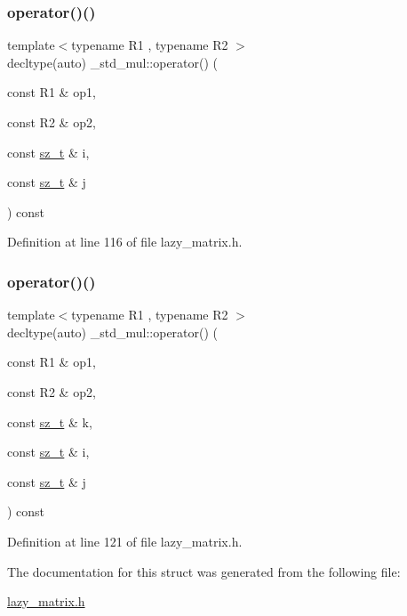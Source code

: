 \subsubsection{\texorpdfstring{operator()()}{operator()()}\hspace{0.1cm}{\footnotesize\ttfamily [1/2]}}
{\footnotesize\ttfamily template$<$typename R1 , typename R2 $>$ \\
decltype(auto) \+\_\+std\+\_\+mul\+::operator() (\begin{DoxyParamCaption}\item[{const R1 \&}]{op1,  }\item[{const R2 \&}]{op2,  }\item[{const \mbox{\hyperlink{lazy__matrix_8h_acba2745dcfc55b2d05ff45adc6a0a015}{sz\+\_\+t}} \&}]{i,  }\item[{const \mbox{\hyperlink{lazy__matrix_8h_acba2745dcfc55b2d05ff45adc6a0a015}{sz\+\_\+t}} \&}]{j }\end{DoxyParamCaption}) const\hspace{0.3cm}{\ttfamily [inline]}}



Definition at line 116 of file lazy\+\_\+matrix.\+h.

\mbox{\label{struct__std__mul_a7042dcb453b74c4e3fa1c70179c38043}} 
\subsubsection{\texorpdfstring{operator()()}{operator()()}\hspace{0.1cm}{\footnotesize\ttfamily [2/2]}}
{\footnotesize\ttfamily template$<$typename R1 , typename R2 $>$ \\
decltype(auto) \+\_\+std\+\_\+mul\+::operator() (\begin{DoxyParamCaption}\item[{const R1 \&}]{op1,  }\item[{const R2 \&}]{op2,  }\item[{const \mbox{\hyperlink{lazy__matrix_8h_acba2745dcfc55b2d05ff45adc6a0a015}{sz\+\_\+t}} \&}]{k,  }\item[{const \mbox{\hyperlink{lazy__matrix_8h_acba2745dcfc55b2d05ff45adc6a0a015}{sz\+\_\+t}} \&}]{i,  }\item[{const \mbox{\hyperlink{lazy__matrix_8h_acba2745dcfc55b2d05ff45adc6a0a015}{sz\+\_\+t}} \&}]{j }\end{DoxyParamCaption}) const\hspace{0.3cm}{\ttfamily [inline]}}



Definition at line 121 of file lazy\+\_\+matrix.\+h.



The documentation for this struct was generated from the following file\+:\begin{DoxyCompactItemize}
\item 
\mbox{\hyperlink{lazy__matrix_8h}{lazy\+\_\+matrix.\+h}}\end{DoxyCompactItemize}
